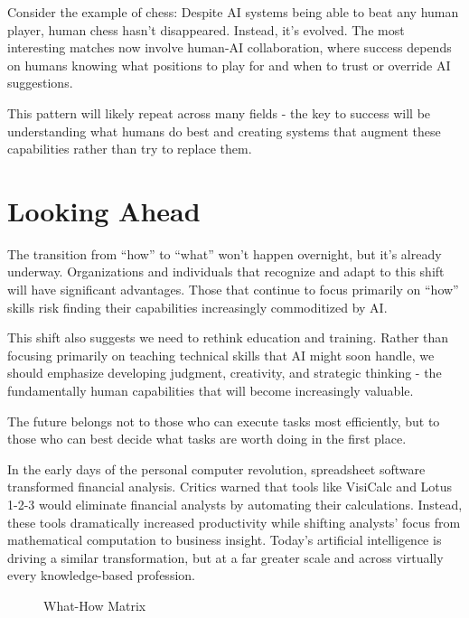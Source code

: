 \documentclass[
  Letterpaper,
]{scrbook}
\begin{document}
Consider the example of chess: Despite AI systems being able to beat any
human player, human chess hasn't disappeared. Instead, it's evolved. The
most interesting matches now involve human-AI collaboration, where
success depends on humans knowing what positions to play for and when to
trust or override AI suggestions.

This pattern will likely repeat across many fields - the key to success
will be understanding what humans do best and creating systems that
augment these capabilities rather than try to replace them.

\section{Looking Ahead}\label{looking-ahead}

The transition from ``how'' to ``what'' won't happen overnight, but it's
already underway. Organizations and individuals that recognize and adapt
to this shift will have significant advantages. Those that continue to
focus primarily on ``how'' skills risk finding their capabilities
increasingly commoditized by AI.

This shift also suggests we need to rethink education and training.
Rather than focusing primarily on teaching technical skills that AI
might soon handle, we should emphasize developing judgment, creativity,
and strategic thinking - the fundamentally human capabilities that will
become increasingly valuable.

The future belongs not to those who can execute tasks most efficiently,
but to those who can best decide what tasks are worth doing in the first
place.

In the early days of the personal computer revolution, spreadsheet
software transformed financial analysis. Critics warned that tools like
VisiCalc and Lotus 1-2-3 would eliminate financial analysts by
automating their calculations. Instead, these tools dramatically
increased productivity while shifting analysts' focus from mathematical
computation to business insight. Today's artificial intelligence is
driving a similar transformation, but at a far greater scale and across
virtually every knowledge-based profession.

\begin{figure}


\caption{\label{fig-what-how-matrix}What-How Matrix}

\end{figure}%
\end{document}
